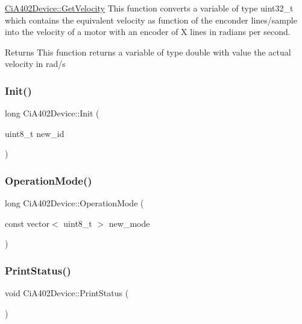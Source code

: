 \hyperlink{classCiA402Device_a54b43f6429da4c6c0241653355e81d36}{Ci\+A402\+Device\+::\+Get\+Velocity} This function converts a variable of type uint32\+\_\+t which contains the equivalent velocity as function of the enconder lines/sample into the velocity of a motor with an encoder of X lines in radians per second. 

\begin{DoxyReturn}{Returns}
This function returns a variable of type double with value the actual velocity in rad/s 
\end{DoxyReturn}
\mbox{\label{classCiA402Device_a622a8884e21d9c4b5ffa0d6c1458ef08}} 
\subsubsection{\texorpdfstring{Init()}{Init()}}
{\footnotesize\ttfamily long Ci\+A402\+Device\+::\+Init (\begin{DoxyParamCaption}\item[{uint8\+\_\+t}]{new\+\_\+id }\end{DoxyParamCaption})\hspace{0.3cm}{\ttfamily [private]}}

\mbox{\label{classCiA402Device_a49f298cf0d4d2d68007b3cb396e93a17}} 
\subsubsection{\texorpdfstring{Operation\+Mode()}{OperationMode()}}
{\footnotesize\ttfamily long Ci\+A402\+Device\+::\+Operation\+Mode (\begin{DoxyParamCaption}\item[{const vector$<$ uint8\+\_\+t $>$}]{new\+\_\+mode }\end{DoxyParamCaption})}

\mbox{\label{classCiA402Device_a9d5d8df28085395a3ab711107a181ebc}} 
\subsubsection{\texorpdfstring{Print\+Status()}{PrintStatus()}}
{\footnotesize\ttfamily void Ci\+A402\+Device\+::\+Print\+Status (\begin{DoxyParamCaption}{ }\end{DoxyParamCaption})}



